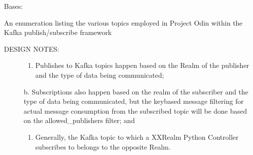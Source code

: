 \documentclass[letterpaper,10pt,english]{sphinxmanual}
\begin{document}

\begin{fulllineitems}
\label{\detokenize{Raven:Raven.KafkaTopics}}
\sphinxAtStartPar
Bases: 

\sphinxAtStartPar
An enumeration listing the various topics employed in Project Odin within the Kafka publish/subscribe framework
\begin{description}
\item[{DESIGN NOTES:}] \leavevmode\begin{enumerate}
%
\item {} 
\sphinxAtStartPar
Publishes to Kafka topics happen based on the Realm of the publisher and the type of data being communicated;

\end{enumerate}

\sphinxAtStartPar
b. Subscriptions also happen based on the realm of the subscriber and the type of data being communicated, but
the key\sphinxhyphen{}based message filtering for actual message consumption from the subscribed topic will be done based on
the allowed\_publishers filter; and
\begin{enumerate}
%
\setcounter{enumi}{2}
\item {} 
\sphinxAtStartPar
Generally, the Kafka topic to which a XXRealm Python Controller subscribes to belongs to the opposite Realm.

\end{enumerate}

\end{description}

\begin{fulllineitems}
\label{\detokenize{Raven:Raven.KafkaTopics.ODIN_CONTROL_EVENTS}}
\end{fulllineitems}


\end{fulllineitems}
\end{document}
